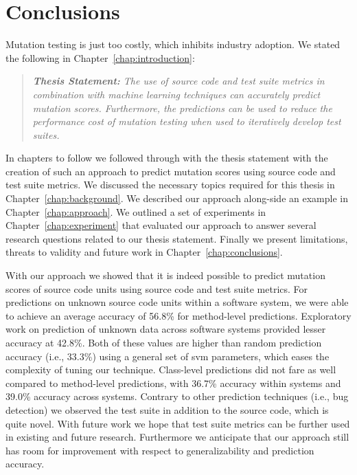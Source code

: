 \section{Conclusions}
\label{sec:conclusions_conclusions}
Mutation testing is just too costly, which inhibits industry adoption. We stated the following in Chapter~\ref{chap:introduction}:

\begin{quote}
  \emph{\textbf{Thesis Statement:} The use of source code and test suite metrics in combination with machine learning techniques can accurately predict mutation scores. Furthermore, the predictions can be used to reduce the performance cost of mutation testing when used to iteratively develop test suites.}
\end{quote}

In chapters to follow we followed through with the thesis statement with the creation of such an approach to predict mutation scores using source code and test suite metrics. We discussed the necessary topics required for this thesis in Chapter~\ref{chap:background}. We described our approach along-side an example in Chapter~\ref{chap:approach}. We outlined a set of experiments in Chapter~\ref{chap:experiment} that evaluated our approach to answer several research questions related to our thesis statement. Finally we present limitations, threats to validity and future work in Chapter~\ref{chap:conclusions}.

With our approach we showed that it is indeed possible to predict mutation scores of source code units using source code and test suite metrics. For predictions on unknown source code units within a software system, we were able to achieve an average accuracy of 56.8\% for method-level predictions. Exploratory work on prediction of unknown data across software systems provided lesser accuracy at 42.8\%. Both of these values are higher than random prediction accuracy (i.e., 33.3\%) using a general set of \gls{svm} parameters, which eases the complexity of tuning our technique. Class-level predictions did not fare as well compared to method-level predictions, with 36.7\% accuracy within systems and 39.0\% accuracy across systems. Contrary to other prediction techniques (i.e., bug detection) we observed the test suite in addition to the source code, which is quite novel. With future work we hope that test suite metrics can be further used in existing and future research. Furthermore we anticipate that our approach still has room for improvement with respect to generalizability and prediction accuracy.
